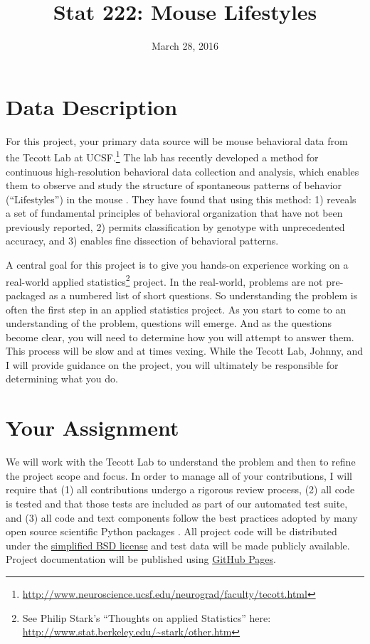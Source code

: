 \documentclass[11pt, oneside]{article}   	%
\title{Stat 222: Mouse Lifestyles}
\date{March 28, 2016}							%
\begin{document}
\maketitle

\section{Data Description}

For this project, your primary data source will be mouse behavioral data from
the Tecott Lab at
UCSF.\footnote{\url{http://www.neuroscience.ucsf.edu/neurograd/faculty/tecott.html}}
The lab has recently developed a method for continuous high-resolution
behavioral data collection and analysis, which enables them to observe and
study the structure of spontaneous patterns of behavior (``Lifestyles'') in the
mouse \cite{tecott2003genes, tecott2004neurobehavioral, goulding2008robust,
anderson2014toward}.  They have found that using this method: 1) reveals a set
of fundamental principles of behavioral organization that have not been
previously reported, 2) permits classification by genotype with unprecedented
accuracy, and 3) enables fine dissection of behavioral patterns.

A central goal for this project is to give you hands-on experience working on a
real-world applied statistics\footnote{See Philip Stark's ``Thoughts on applied
Statistics'' here: \url{http://www.stat.berkeley.edu/~stark/other.htm}}
project.  In the real-world, problems are not pre-packaged as a numbered list
of short questions.  So understanding the problem is often the first step in an
applied statistics project.  As you start to come to an understanding of the
problem, questions will emerge.  And as the questions become clear, you will
need to determine how you will attempt to answer them.  This process will be
slow and at times vexing.  While the Tecott Lab, Johnny, and I will provide
guidance on the project, you will ultimately be responsible for determining
what you do.

\section{Your Assignment}

We will work with the Tecott Lab to understand the problem and then to refine
the project scope and focus.  In order to manage all of your contributions, I
will require that (1) all contributions undergo a rigorous review process, (2)
all code is tested and that those tests are included as part of our automated
test suite, and (3) all code and text components follow the best practices
adopted by many open source scientific Python packages
\cite{millman2014developing}.  All project code will be distributed under the
\href{https://en.wikipedia.org/wiki/BSD_licenses\#2-clause_license_.28.22Simplified_BSD_License.22_or_.22FreeBSD_License.22.29}{simplified
BSD license} and test data will be made publicly available.  Project
documentation will be published using \href{https://pages.github.com/}{GitHub
Pages}.
\end{document}

